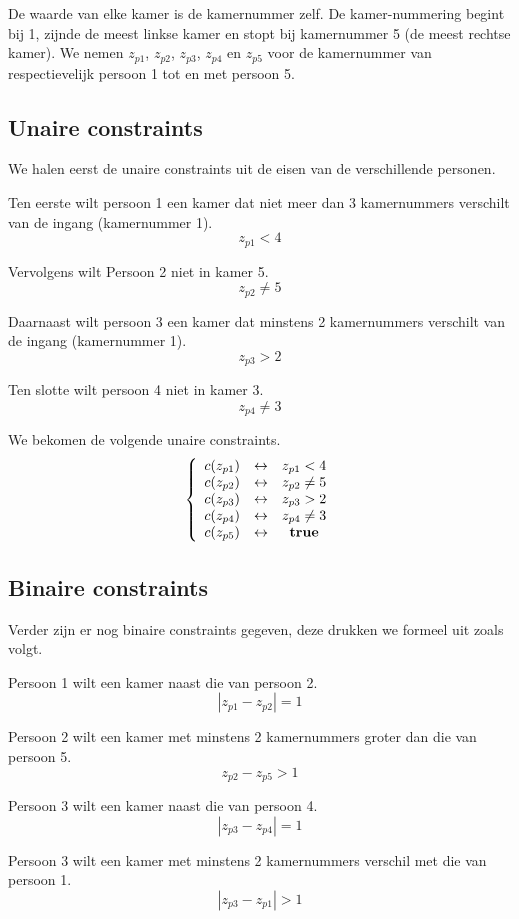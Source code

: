 \documentclass{article}
\begin{document}
De waarde van elke kamer is de kamernummer zelf. De kamer-nummering begint bij 1, zijnde de meest linkse kamer en stopt bij kamernummer 5 (de meest rechtse kamer). We nemen $z_{p1}$, $z_{p2}$, $z_{p3}$, $z_{p4}$ en $z_{p5}$ voor de kamernummer van respectievelijk persoon 1 tot en met persoon 5.

\subsection{Unaire constraints}
We halen eerst de unaire constraints uit de eisen van de verschillende personen.

Ten eerste wilt persoon 1 een kamer dat niet meer dan 3 kamernummers verschilt van de ingang (kamernummer 1).
\[
z_{p1} < 4
\]

Vervolgens wilt Persoon 2 niet in kamer 5.
\[
z_{p2} \neq 5
\]

Daarnaast wilt persoon 3 een kamer dat minstens 2 kamernummers verschilt van de ingang (kamernummer 1).
\[
z_{p3} > 2
\]

Ten slotte wilt persoon 4 niet in kamer 3.
\[
z_{p4} \neq 3
\]

We bekomen de volgende unaire constraints.
\[
\left\lbrace
\begin{array}{c c c}
c(z_{p1}) & \leftrightarrow & z_{p1} < 4\\
c(z_{p2}) & \leftrightarrow & z_{p2} \neq 5\\
c(z_{p3}) & \leftrightarrow & z_{p3} > 2\\
c(z_{p4}) & \leftrightarrow & z_{p4} \neq 3\\
c(z_{p5}) & \leftrightarrow & \textbf{true}\\
\end{array}
\right.
\]

\newpage
\subsection{Binaire constraints}
Verder zijn er nog binaire constraints gegeven, deze drukken we formeel uit zoals volgt.

Persoon 1 wilt een kamer naast die van persoon 2.
\[
|z_{p1} - z_{p2}| = 1
\]

Persoon 2 wilt een kamer met minstens 2 kamernummers groter dan die van persoon 5.
\[
z_{p2} - z_{p5} > 1
\]

Persoon 3 wilt een kamer naast die van persoon 4.
\[
|z_{p3} - z_{p4}| = 1
\]

Persoon 3 wilt een kamer met minstens 2 kamernummers verschil met die van persoon 1.
\[
|z_{p3} - z_{p1}| > 1
\]
\end{document}
